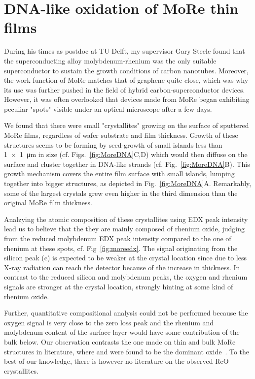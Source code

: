 \section{DNA-like oxidation of MoRe thin films}
\label{sec:more}

During his times as postdoc at TU Delft, my supervisor Gary Steele found that the superconducting alloy molybdenum-rhenium was the only suitable superconductor to sustain the growth conditions of carbon nanotubes.
Moreover, the work function of MoRe matches that of graphene quite close, which was why its use was further pushed in the field of hybrid carbon-superconductor devices.
However, it was often overlooked that devices made from MoRe began exhibiting peculiar "spots" visible under an optical microscope after a few days.

We found that there were small "crystallites" growing on the surface of sputtered MoRe films, regardless of wafer substrate and film thickness.
Growth of these structures seems to be forming by seed-growth of small islands less than \SI{1x1}{\micro\meter} in size (cf. Figs.~\ref{fig:MoreDNA}C,D) which would then diffuse on the surface and cluster together in DNA-like strands (cf. Fig.~\ref{fig:MoreDNA}B).
This growth mechanism covers the entire film surface with small islands, lumping together into bigger structures, as depicted in Fig.~\ref{fig:MoreDNA}A.
Remarkably, some of the largest crystals grew even higher in the third dimension than the original MoRe film thickness.

Analzying the atomic composition of these crystallites using EDX peak intensity lead us to believe that the they are mainly composed of rhenium oxide, judging from the reduced molybdenum EDX peak intensity compared to the one of rhenium at these spots, cf. Fig~\ref{fig:moreedx}.
The signal originating from the silicon peak (c) is expected to be weaker at the crystal location since due to less X-ray radiation can reach the detector because of the increase in thickness.
In contrast to the reduced silicon and molybdenum peaks, the oxygen and rhenium signals are stronger at the crystal location, strongly hinting at some kind of rhenium oxide.

Further, quantitative compositional analysis could not be performed because the oxygen signal is very close to the zero loss peak and the rhenium and molybdenum content of the surface layer would have some contribution of the bulk below.
Our observation contrasts the one made on thin and bulk MoRe structures in literature, where  and  were found to be the dominant oxide~\cite{seleznevDepositionCharacterizationFewnanometersthick2008b,gotzCosputteredMoReThin2016}.
To the best of our knowledge, there is however no literature on the observed ReO crystallites.

